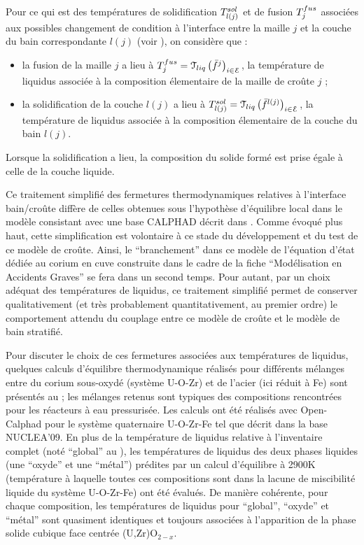 Pour ce qui est des températures de solidification $\temperature[sol]{l(j)}$ et de fusion $\temperature[fus]{j}$ associées aux possibles changement de condition à l'interface entre la maille $j$ et la couche du bain correspondante $l(j)$ (voir ), on considère que :
\begin{itemize}
 \item la fusion de la maille $j$ a lieu à $\temperature[fus]{j}=\Mc{T}_{liq}\left(\elementMassFraction[j]{}\right)_{i\in\elementSet}$, la température de liquidus associée à la composition élementaire de la maille de croûte $j$ ;
 \item la solidification de la couche $l(j)$ a lieu à $\temperature[sol]{l(j)}=\Mc{T}_{liq}\left(\elementMassFraction[l(j)]{}\right)_{i\in\elementSet}$, la température de liquidus associée à la composition élementaire de la couche du bain $l(j)$.
\end{itemize}
Lorsque la solidification a lieu, la composition du solide formé est prise égale à celle de la couche liquide. 

Ce traitement simplifié des fermetures thermodynamiques relatives à l'interface bain/croûte diffère de celles obtenues sous l'hypothèse d'équilibre local dans le modèle consistant avec une base CALPHAD décrit dans \cite{Tiwari2018}. Comme évoqué plus haut, cette simplification est volontaire à ce stade du développement et du test de ce modèle de croûte. Ainsi, le ``branchement'' dans ce modèle de l'équation d'état dédiée au corium en cuve construite dans le cadre de la fiche ``Modélisation en Accidents Graves'' se fera dans un second temps. Pour autant, par un choix adéquat des températures de liquidus, ce traitement simplifié permet de conserver qualitativement (et très probablement quantitativement, au premier ordre) le comportement attendu du couplage entre ce modèle de croûte et le modèle de bain stratifié.

Pour discuter le choix de ces fermetures associées aux températures de liquidus, quelques calculs d'équilibre thermodynamique réalisés pour différents mélanges entre du corium sous-oxydé (système U-O-Zr) et de l'acier (ici réduit à Fe) sont présentés au  ; les mélanges retenus sont typiques des compositions rencontrées pour les réacteurs à eau pressurisée. Les calculs ont été réalisés avec Open-Calphad pour le système quaternaire U-O-Zr-Fe tel que décrit dans la base NUCLEA'09. En plus de la température de liquidus relative à l'inventaire complet (noté ``global'' au ), les températures de liquidus des deux phases liquides (une ``oxyde'' et une ``métal'') prédites par un calcul d'équilibre à 2900K (température à laquelle toutes ces compositions sont dans la lacune de miscibilité liquide du système U-O-Zr-Fe) ont été évalués. De manière cohérente, pour chaque composition, les températures de liquidus pour ``global'', ``oxyde'' et ``métal'' sont quasiment identiques et toujours associées à l'apparition de la phase solide cubique face centrée (U,Zr)O$_{2-x}$.

